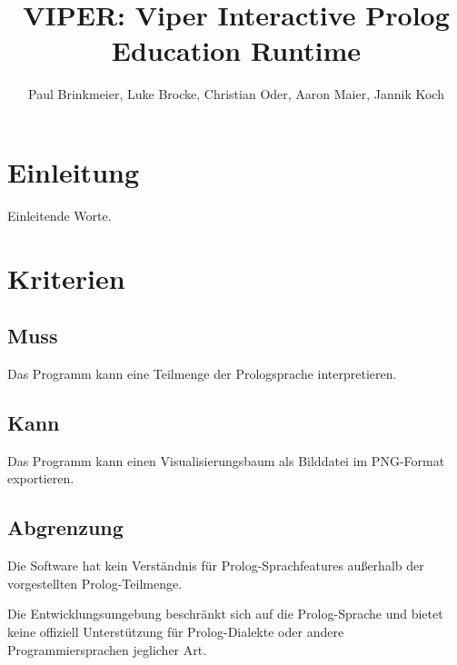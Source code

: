 \documentclass[parskip=full,11pt,twoside]{scrartcl}
\title{VIPER: Viper Interactive Prolog Education Runtime}
\author{Paul Brinkmeier, Luke Brocke, Christian Oder, Aaron Maier, Jannik Koch}
\begin{document}
\maketitle

\section{Einleitung}

Einleitende Worte.

\pagebreak
\section{Kriterien}

\subsection{Muss}


Das Programm kann eine Teilmenge der Prologsprache interpretieren.

\subsection{Kann}


Das Programm kann einen Visualisierungsbaum als Bilddatei im PNG-Format exportieren.

\subsection{Abgrenzung}


Die Software hat kein Verständnis für Prolog-Sprachfeatures außerhalb der vorgestellten Prolog-Teilmenge.


Die Entwicklungsumgebung beschränkt sich auf die Prolog-Sprache und bietet keine offiziell Unterstützung für Prolog-Dialekte oder andere Programmiersprachen jeglicher Art.

\end{document}
